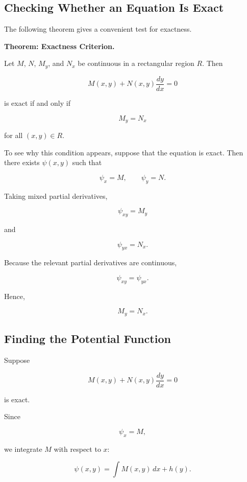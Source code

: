 \documentclass[11pt]{article}
\newenvironment{theorembox}[1]
    {\par\medskip\noindent\textbf{Theorem: #1.}\par}
    {\par\medskip}
\begin{document}
\subsection{Checking Whether an Equation Is Exact}

The following theorem gives a convenient test for exactness.

\begin{theorembox}{Exactness Criterion}

Let $M$, $N$, $M_y$, and $N_x$ be continuous in a rectangular region
$R$. Then

\[
M(x,y)+N(x,y)\frac{dy}{dx}=0
\]

is exact if and only if

\[
\boxed{M_y=N_x}
\]

for all $(x,y)\in R$.

\end{theorembox}

To see why this condition appears, suppose that the equation is exact.
Then there exists $\psi(x,y)$ such that

\[
\psi_x=M,
\qquad
\psi_y=N.
\]

Taking mixed partial derivatives,

\[
\psi_{xy}=M_y
\]

and

\[
\psi_{yx}=N_x.
\]

Because the relevant partial derivatives are continuous,

\[
\psi_{xy}=\psi_{yx}.
\]

Hence,

\[
\boxed{M_y=N_x}.
\]

\subsection{Finding the Potential Function}

Suppose

\[
M(x,y)+N(x,y)\frac{dy}{dx}=0
\]

is exact.

Since

\[
\psi_x=M,
\]

we integrate $M$ with respect to $x$:

\[
\boxed{
\psi(x,y)
=
\int M(x,y)\,dx+h(y)
}.
\]
\end{document}
